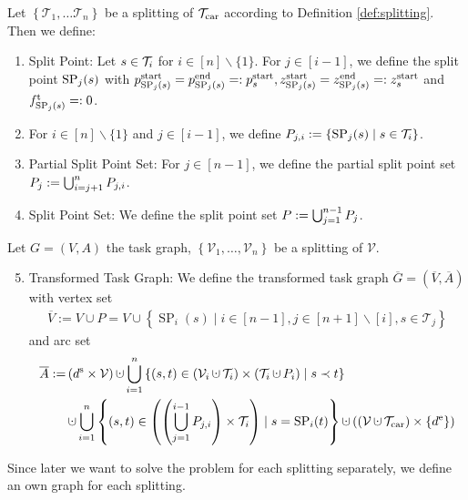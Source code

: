 \begin{definition}

Let $\left\{\mathcal{T}_1,\dots\mathcal{T}_n\right\}$ be a splitting of $\mathcal{T}_{\operatorname{car}}$ according to Definition \ref{def:splitting}. Then we define:

\begin{enumerate}
	\item{Split Point: Let $s\in\mathcal{T}_i$ for $i\in[n]\backslash\{1\}$. For $j\in[i-1]$, we define the split point $\operatorname{SP}_j(s)$ with $p^{\operatorname{start}}_{\operatorname{SP}_j(s)}=p^{\operatorname{end}}_{\operatorname{SP}_j(s)}=:p^{\operatorname{start}}_s, z^{\operatorname{start}}_{\operatorname{SP}_j(s)}=z^{\operatorname{end}}_{\operatorname{SP}_j(s)}=:z^{\operatorname{start}}_s$ and $f^{\operatorname{t}}_{\operatorname{SP}_j(s)}=:0$.}
	\item{For $i\in[n]\backslash\{1\}$ and $j\in[i-1]$, we define $P_{j,i}:=\left\{\operatorname{SP}_j(s)\mid s\in\mathcal{T}_i\right\}$.}
	\item{Partial Split Point Set: For $j\in[n-1]$, we define the partial split point set $P_j:=\bigcup_{i=j+1}^n P_{j,i}$.}
	\item{Split Point Set: We define the split point set $P:=\bigcup_{j=1}^{n-1}P_j$.}
\end{enumerate}

Let $G=(V,A)$ the task graph, $\left\{\mathcal{V}_1,\dots,\mathcal{V}_n\right\}$ be a splitting of $\mathcal{V}$.

\begin{enumerate}
	\setcounter{enumi}{4}
	\item{Transformed Task Graph: We define the transformed task graph $\overline{G}=\left(\overline{V},\overline{A}\right)$ with vertex set
		\begin{align*}
			\overline{V} := V\cup P = V\cup\left\{\operatorname{SP}_i(s)\mid i\in[n-1],j\in[n+1]\backslash[i],s\in\mathcal{T}_j\right\}
		\end{align*}
		and arc set
		\begin{align*}
			\overline{A} := & \left(\ds\times\mathcal{V}\right)\cupdot\bigcup_{i=1}^n\left\{(s,t)\in\left(\Vi\cupdot\Ti\right)\times\left(\Ti\cupdot P_i\right)\mid s\prec t\right\} \\
			& \cupdot\bigcup_{i=1}^n\left\{(s,t)\in\left(\left(\bigcup_{j=1}^{i-1} P_{j,i}\right)\times\Ti\right)\mid s=\operatorname{SP}_i(t)\right\}\cupdot \left(\left(\mathcal{V}\cupdot\Tcar\right)\times\left\{\de\right\}\right)
		\end{align*}}
\end{enumerate}

\end{definition}

Since later we want to solve the problem for each splitting separately, we define an own graph for each splitting.

